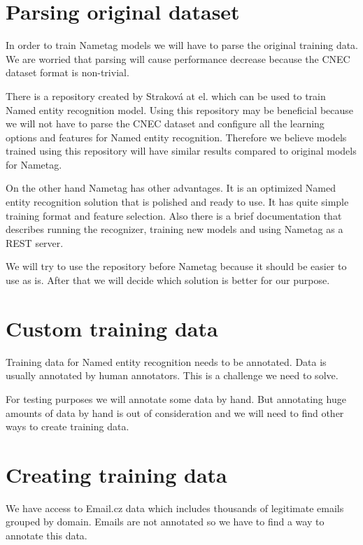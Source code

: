 \documentclass[thesis=B,english]{FITthesis}[2012/10/20]
\begin{document}
\section{Parsing original dataset}
In order to train Nametag models we will have to parse the original training data. We are worried that parsing will cause performance decrease because the CNEC dataset format is non-trivial.

\par There is a repository created by Strakov{\' a} at el. \cite{repoStrakovaNER} which can be used to train Named entity recognition model. Using this repository may be beneficial because we will not have to parse the CNEC dataset and configure all the learning options and features for Named entity recognition. Therefore we believe models trained using this repository will have similar results compared to original models for Nametag.

\par On the other hand Nametag has other advantages. It is an optimized Named entity recognition solution that is polished and ready to use. \cite{nametagWebsite} It has quite simple training format and feature selection. Also there is a brief documentation that describes running the recognizer, training new models and using Nametag as a REST server.

\par We will try to use the repository \cite{repoStrakovaNER} before Nametag because it should be easier to use as is. After that we will decide which solution is better for our purpose. 


\section{Custom training data}
Training data for Named entity recognition needs to be annotated. Data is usually annotated by human annotators. \cite{cnec} This is a challenge we need to solve.
\par For testing purposes we will annotate some data by hand. But annotating huge amounts of data by hand is out of consideration and we will need to find other ways to create training data.

\section{Creating training data}
We have access to Email.cz data which includes thousands of legitimate emails grouped by domain. Emails are not annotated so we have to find a way to annotate this data.
\end{document}

